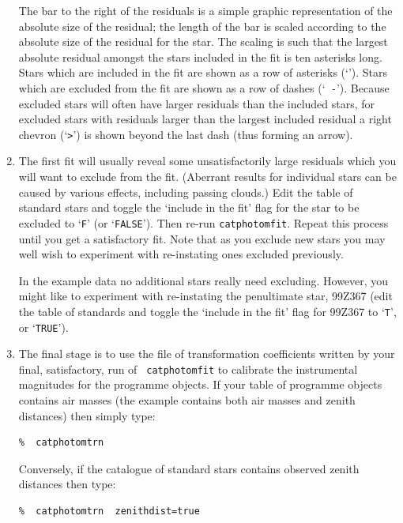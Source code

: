 \documentclass[twoside,11pt]{article}
\begin{document}
\begin{enumerate}
   The bar to the right of the residuals is a simple graphic
   representation of the absolute size of the residual; the length of the
   bar is scaled according to the absolute size of the residual for the
   star.  The scaling is such that the largest absolute residual amongst
   the stars included in the fit is ten asterisks long.  Stars which are
   included in the fit are shown as a row of asterisks (`{\tt *}').  Stars
   which are excluded from the fit are shown as a row of dashes (`{\tt
   -}').  Because excluded stars will often have larger residuals than the
   included stars, for excluded stars with residuals larger than the
   largest included residual a right chevron (`\verb->-') is shown beyond
   the last dash (thus forming an arrow).

  \item The first fit will usually reveal some unsatisfactorily large
   residuals which you will want to exclude from the fit.  (Aberrant
   results for individual stars can be caused by various effects, including
   passing clouds.)  Edit the table of standard stars and toggle the
   `include in the fit' flag for the star to be excluded to `{\tt F}'
   (or `{\tt FALSE}').  Then re-run {\tt catphotomfit}.  Repeat this
   process until you get a satisfactory fit.  Note that as you exclude
   new stars you may well wish to experiment with re-instating ones
   excluded previously.

   In the example data no additional stars really need excluding.
   However, you might like to experiment with re-instating the
   penultimate star, 99Z367 (edit the table of standards and toggle the
   `include in the fit' flag for 99Z367 to `{\tt T}', or `{\tt TRUE}').

  \item The final stage is to use the file of transformation
   coefficients written by your final, satisfactory, run of {\tt
   catphotomfit} to calibrate the instrumental magnitudes for the
   programme objects.  If your table of programme objects contains air
   masses (the example contains both air masses and zenith distances)
   then simply type:

\begin{verbatim}
%  catphotomtrn
\end{verbatim}

   Conversely, if the catalogue of standard stars contains observed
   zenith distances then type:

\begin{verbatim}
%  catphotomtrn  zenithdist=true
\end{verbatim}


\end{enumerate}
\end{document}
